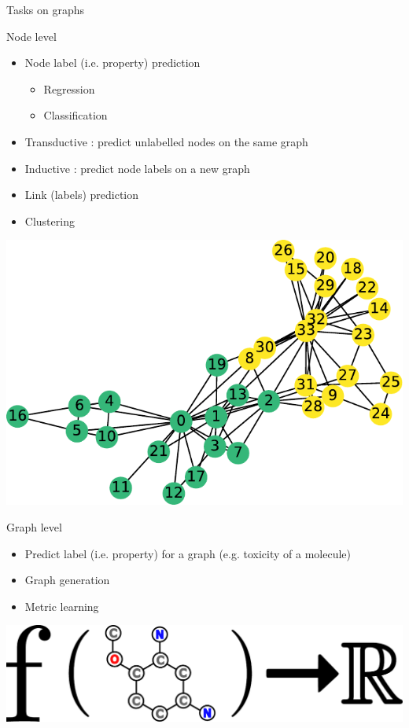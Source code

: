 \documentclass[11pt]{beamer}
\begin{document}
\begin{frame}[allowframebreaks]{Tasks on graphs}

  \begin{block}{Node level}
    \begin{itemize}
    \item Node label (i.e. property) prediction
    \begin{itemize}
        \item Regression
        \item Classification
    \end{itemize}
    \item Transductive : predict unlabelled nodes on the same graph
    \item Inductive  : predict node labels on a new graph
    \item Link (labels) prediction
    \item Clustering 
    \end{itemize}
  \end{block}
  \begin{center}
    \includegraphics[width=.4\textwidth]{karate}
  \end{center}
  \break
  \begin{block}{Graph level}
    \begin{itemize}
    \item Predict label (i.e. property) for a graph (e.g. toxicity of a molecule)
    \item Graph generation
    \item Metric learning
    \end{itemize}
  \end{block}

  \begin{center}
    \includegraphics[width=.5\textwidth]{graph_level_function}
  \end{center}
    
\end{frame}
\end{document}
